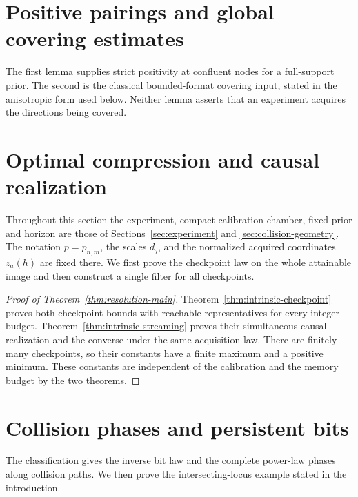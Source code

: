 \maketitle











\section{Positive pairings and global covering estimates}\label{sec:analytic-inputs}
The first lemma supplies strict positivity at confluent nodes for a
full-support prior. The second is the classical bounded-format
covering input, stated in the anisotropic form used below. Neither
lemma asserts that an experiment acquires the directions being covered.


\section{Optimal compression and causal realization}\label{sec:direct-classification}
Throughout this section the experiment, compact calibration chamber,
fixed prior and horizon are those of Sections~\ref{sec:experiment} and
\ref{sec:collision-geometry}. The notation $p=p_{n,m}$, the scales
$d_j$, and the normalized acquired coordinates $z_a(h)$ are fixed there.
We first prove the checkpoint law on the whole attainable image and
then construct a single filter for all checkpoints.

\begin{proof}[Proof of Theorem~\ref{thm:resolution-main}]
Theorem~\ref{thm:intrinsic-checkpoint} proves both checkpoint bounds
with reachable representatives for every integer budget.
Theorem~\ref{thm:intrinsic-streaming} proves their simultaneous causal
realization and the converse under the same acquisition law. There
are finitely many checkpoints, so their constants have a finite
maximum and a positive minimum. These constants are independent of
the calibration and the memory budget by the two theorems.
\end{proof}
\section{Collision phases and persistent bits}\label{sec:collision-phases}
The classification gives the inverse bit law and the complete power-law
phases along collision paths. We then prove the intersecting-locus
example stated in the introduction.


















